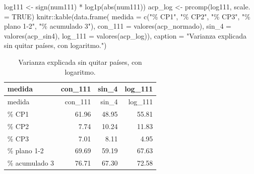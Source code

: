\documentclass[oneside, openany, fontset=libertinus]{mitthesis}
\newenvironment{Shaded}{\begin{snugshade}}{\end{snugshade}}
\newcommand{\AttributeTok}[1]{\textcolor[rgb]{0.40,0.45,0.13}{#1}}
\newcommand{\ConstantTok}[1]{\textcolor[rgb]{0.56,0.35,0.01}{#1}}
\newcommand{\DecValTok}[1]{\textcolor[rgb]{0.68,0.00,0.00}{#1}}
\newcommand{\FloatTok}[1]{\textcolor[rgb]{0.68,0.00,0.00}{#1}}
\newcommand{\FunctionTok}[1]{\textcolor[rgb]{0.28,0.35,0.67}{#1}}
\newcommand{\NormalTok}[1]{\textcolor[rgb]{0.00,0.23,0.31}{#1}}
\newcommand{\OtherTok}[1]{\textcolor[rgb]{0.00,0.23,0.31}{#1}}
\newcommand{\SpecialCharTok}[1]{\textcolor[rgb]{0.37,0.37,0.37}{#1}}
\newcommand{\StringTok}[1]{\textcolor[rgb]{0.13,0.47,0.30}{#1}}
\begin{document}
\Needspace{3.61in}

\begin{Shaded}
\begin{Highlighting}[]
\NormalTok{log111 }\OtherTok{\textless{}{-}} \FunctionTok{sign}\NormalTok{(num111) }\SpecialCharTok{*} \FunctionTok{log1p}\NormalTok{(}\FunctionTok{abs}\NormalTok{(num111))}
\NormalTok{acp\_log }\OtherTok{\textless{}{-}} \FunctionTok{prcomp}\NormalTok{(log111, }\AttributeTok{scale. =} \ConstantTok{TRUE}\NormalTok{)}
\NormalTok{knitr}\SpecialCharTok{::}\FunctionTok{kable}\NormalTok{(}\FunctionTok{data.frame}\NormalTok{(}
  \AttributeTok{medida =} \FunctionTok{c}\NormalTok{(}\StringTok{"\% CP1"}\NormalTok{, }\StringTok{"\% CP2"}\NormalTok{, }\StringTok{"\% CP3"}\NormalTok{, }\StringTok{"\% plano 1{-}2"}\NormalTok{,}
             \StringTok{"\% acumulado 3"}\NormalTok{),}
  \AttributeTok{con\_111 =} \FunctionTok{valores}\NormalTok{(acp\_normado), }\AttributeTok{sin\_4 =} \FunctionTok{valores}\NormalTok{(acp\_sin4),}
  \AttributeTok{log\_111 =} \FunctionTok{valores}\NormalTok{(acp\_log)),}
  \AttributeTok{caption =} \StringTok{"Varianza explicada sin quitar países, con logaritmo."}\NormalTok{)}
\end{Highlighting}
\end{Shaded}

\Needspace{2.12in}

\begin{longtable}[]{@{}lrrr@{}}
\caption{Varianza explicada sin quitar países, con
logaritmo.}\tabularnewline
\toprule\noalign{}
medida & con\_111 & sin\_4 & log\_111 \\
\midrule\noalign{}
\endfirsthead
\toprule\noalign{}
medida & con\_111 & sin\_4 & log\_111 \\
\midrule\noalign{}
\endhead
\bottomrule\noalign{}
\endlastfoot
\% CP1 & 61.96 & 48.95 & 55.81 \\
\% CP2 & 7.74 & 10.24 & 11.83 \\
\% CP3 & 7.01 & 8.11 & 4.95 \\
\% plano 1-2 & 69.69 & 59.19 & 67.63 \\
\% acumulado 3 & 76.71 & 67.30 & 72.58 \\
\end{longtable}

\Needspace{1.14in}

\begin{Shaded}
\end{Shaded}
\end{document}
